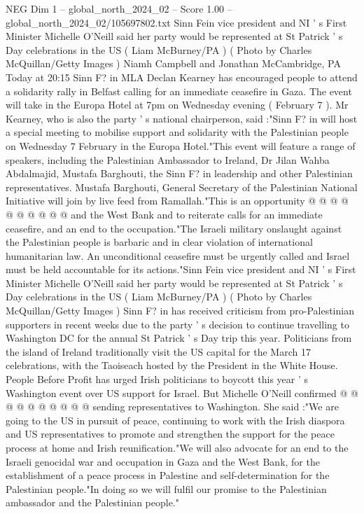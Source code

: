 \begin{textsample}{NEG Dim 1 – global\_north\_2024\_02 – Score 1.00 – global\_north\_2024\_02/105697802.txt}  \label{ex:f1_neg_353}
Sinn Fein vice president and NI ' s First Minister Michelle O'Neill said her party would be represented at St Patrick ' s Day celebrations in the US ( Liam McBurney/PA ) ( Photo by Charles McQuillan/Getty Images ) Niamh Campbell and Jonathan McCambridge, PA Today at 20:15 Sinn F? in MLA Declan Kearney has encouraged people to attend a solidarity rally in Belfast calling for an immediate ceasefire in Gaza.
The event will take in the Europa Hotel at 7pm on Wednesday evening ( February 7 ).
Mr Kearney, who is also the party ' s national chairperson, said :"Sinn F? in will host a special meeting to mobilise support and solidarity with the Palestinian people on Wednesday 7 February in the Europa Hotel."This event will feature a range of speakers, including the Palestinian Ambassador to Ireland, Dr Jilan Wahba Abdalmajid, Mustafa Barghouti, the Sinn F? in leadership and other Palestinian representatives.
Mustafa Barghouti, General Secretary of the Palestinian National Initiative will join by live feed from Ramallah."This is an opportunity @ @ @ @ @ @ @ @ @ @ and the West Bank and to reiterate calls for an immediate ceasefire, and an end to the occupation."The Israeli military onslaught against the Palestinian people is barbaric and in clear violation of international humanitarian law.
An unconditional ceasefire must be urgently called and Israel must be held accountable for its actions."Sinn Fein vice president and NI ' s First Minister Michelle O'Neill said her party would be represented at St Patrick ' s Day celebrations in the US ( Liam McBurney/PA ) ( Photo by Charles McQuillan/Getty Images ) Sinn F? in has received criticism from pro-Palestinian supporters in recent weeks due to the party ' s decision to continue travelling to Washington DC for the annual St Patrick ' s Day trip this year.
Politicians from the island of Ireland traditionally visit the US capital for the March 17 celebrations, with the Taoiseach hosted by the President in the White House.
People Before Profit has urged Irish politicians to boycott this year ' s Washington event over US support for Israel.
But Michelle O'Neill confirmed @ @ @ @ @ @ @ @ @ @ sending representatives to Washington.
She said :"We are going to the US in pursuit of peace, continuing to work with the Irish diaspora and US representatives to promote and strengthen the support for the peace process at home and Irish reunification."We will also advocate for an end to the Israeli genocidal war and occupation in Gaza and the West Bank, for the establishment of a peace process in Palestine and self-determination for the Palestinian people."In doing so we will fulfil our promise to the Palestinian ambassador and the Palestinian people."

\end{textsample}
